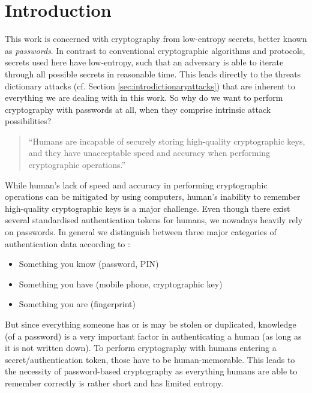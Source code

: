 
\chapter{Introduction}\label{ch:intro}  %

\ifpdf
    \graphicspath{{Chapters/Figs/Raster/}{Chapters/Figs/PDF/}{Chapters/Figs/}}
\else
    \graphicspath{{Chapters/Figs/Vector/}{Chapters/Figs/}}
\fi

This work is concerned with cryptography from low-entropy secrets, better known as \emph{passwords}.
In contrast to conventional cryptographic algorithms and protocols, secrets used here have low-entropy, such that an adversary is able to iterate through all possible secrets in reasonable time.
This leads directly to the threats dictionary attacks (cf. Section \ref{sec:introdictionaryattacks}) that are inherent to everything we are dealing with in this work.
So why do we want to perform cryptography with passwords at all, when they comprise intrinsic attack possibilities?

\begin{quote}
``Humans are incapable of securely storing high-quality cryptographic keys, and they have unacceptable speed and accuracy when performing cryptographic operations.''~\citet{Kaufmann02}
\end{quote}

\noindent
While human's lack of speed and accuracy in performing cryptographic operations can be mitigated by using computers, human's inability to remember high-quality cryptographic keys is a major challenge.
Even though there exist several standardised authentication tokens for humans, we nowadays heavily rely on passwords.
In general we distinguish between three major categories of authentication data according to \citet{Burr11}:
\begin{itemize}
	\item Something you know (\eg password, \ac{PIN})
	\item Something you have (\eg mobile phone, cryptographic key)
	\item Something you are (\eg fingerprint)
\end{itemize}
But since everything someone has or is may be stolen or duplicated, knowledge (of a password) is a very important factor in authenticating a human (as long as it is not written down).
To perform cryptography with humans entering a secret/authentication token, those have to be human-memorable.
This leads to the necessity of password-based cryptography as everything humans are able to remember correctly is rather short and has limited entropy.

